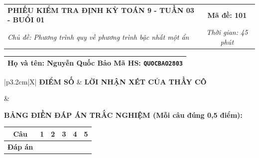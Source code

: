 \documentclass[12pt,a4paper]{article}
\begin{document}
\pagestyle{empty}



\noindent
\begin{tabularx}{\linewidth}{|X|c|}
\hline
\textbf{PHIẾU KIỂM TRA ĐỊNH KỲ TOÁN 9 - TUẦN 03 - BUỔI 01} & \textbf{Mã đề: 101} \\
\textit{Chủ đề: Phương trình quy về phương trình bậc nhất một ẩn} & \textit{Thời gian: 45 phút} \\
\hline
\end{tabularx}

\vspace{1mm}

\noindent
\begin{tabularx}{\linewidth}{|X|}
\hline
\rule[-2mm]{0pt}{7.5mm}\textbf{Họ và tên:} \textbf{\large Nguyễn Quốc Bảo} \hfill \textbf{Mã HS:} \texttt{QUOCBAO2803} \quad \\
\hline
\end{tabularx}

\vspace{1mm}

\noindent
\begin{tabularx}{\linewidth}{|p{3.2cm}|X|}
\hline
\centering\textbf{ĐIỂM SỐ} & \centering\textbf{LỜI NHẬN XÉT CỦA THẦY CÔ} \tabularnewline
\hline
\rule{0pt}{1.3cm} & \tabularnewline
\hline
\end{tabularx}

\vspace{1.2mm}

\noindent\textbf{BẢNG ĐIỀN ĐÁP ÁN TRẮC NGHIỆM (Mỗi câu đúng 0,5 điểm):}
\vspace{0.8mm}

\noindent
\renewcommand{\arraystretch}{1.35}
\begin{tabularx}{\linewidth}{|c|*{5}{>{\centering\arraybackslash}X|}}
\hline
\textbf{Câu} & \textbf{1} & \textbf{2} & \textbf{3} & \textbf{4} & \textbf{5} \\
\hline
\textbf{Đáp án} & & & & & \\
\hline
\end{tabularx}
\renewcommand{\arraystretch}{1.0}

\vspace{1.5mm}
\end{document}
